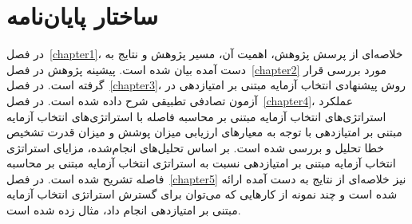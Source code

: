 \section{ساختار پایان‌نامه}

در فصل~\ref{chapter1}، خلاصه‌ای از پرسش پژوهش، اهمیت آن، مسیر پژوهش و نتایج به دست آمده بیان شده است. پیشینه پژوهش در فصل~\ref{chapter2} مورد بررسی قرار گرفته است. در فصل~\ref{chapter3}، روش پیشنهادی انتخاب آزمایه مبتنی بر امتیازدهی در آزمون تصادفی تطبیقی شرح داده شده است. در فصل~\ref{chapter4}، عملکرد استراتژی‌های انتخاب آزمایه مبتنی بر محاسبه فاصله با استراتژی‌های انتخاب آزمایه مبتنی بر امتیازدهی با توجه به معیارهای ارزیابی میزان پوشش و میزان قدرت تشخیص خطا تحلیل و بررسی شده است. بر اساس تحلیل‌های انجام‌شده، مزایای استراتژی انتخاب آزمایه مبتنی بر امتیازدهی نسبت به استراتژی انتخاب آزمایه مبتنی بر  محاسبه فاصله تشریح شده است. در فصل~\ref{chapter5} نیز خلاصه‌ای از نتایج به دست آمده ارائه شده است و چند نمونه از کارهایی که می‌توان برای گسترش استراتژی انتخاب آزمایه مبتنی بر امتیازدهی انجام داد، مثال زده شده است.












